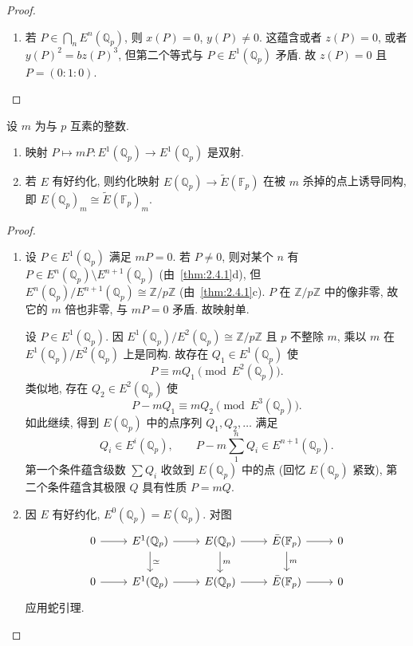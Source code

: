 \begin{proof}
\begin{enumerate}[label=\textup{(\alph*)}]
\item 若 $P\in\bigcap_n E^n(\mathbb{Q}_p)$, 则 $x(P) = 0$, $y(P)\neq 0$. 这蕴含或者 $z(P) = 0$, 或者 $y(P)^2 = bz(P)^3$, 但第二个等式与 $P\in E^1(\mathbb{Q}_p)$ 矛盾. 故 $z(P) = 0$ 且 $P = (0:1:0)$.


\end{enumerate}\end{proof}

\begin{corollary} \label{thm:2.4.2} 
设 $m$ 为与 $p$ 互素的整数.
\begin{enumerate}[label=\textup{(\alph*)}]
\item 映射 $P\mapsto mP\colon E^1(\mathbb{Q}_p)\to E^1(\mathbb{Q}_p)$ 是双射.
\item 若 $E$ 有好约化, 则约化映射 $E(\mathbb{Q}_p)\to\tilde{E}(\mathbb{F}_p)$ 在被 $m$ 杀掉的点上诱导同构, 即 $E(\mathbb{Q}_p)_m\cong\tilde{E}(\mathbb{F}_p)_m$.
\end{enumerate}
\end{corollary}

\begin{proof}\begin{enumerate}[label=\textup{(\alph*)}]

\item 设 $P\in E^1(\mathbb{Q}_p)$ 满足 $mP = 0$. 若 $P\neq 0$, 则对某个 $n$ 有 $P\in E^n(\mathbb{Q}_p)\setminus E^{n+1}(\mathbb{Q}_p)$ (由~\ref{thm:2.4.1}d), 但 $E^n(\mathbb{Q}_p)/E^{n+1}(\mathbb{Q}_p)\cong\mathbb{Z}/p\mathbb{Z}$ (由~\ref{thm:2.4.1}c). $P$ 在 $\mathbb{Z}/p\mathbb{Z}$ 中的像非零, 故它的 $m$ 倍也非零, 与 $mP = 0$ 矛盾. 故映射单.

设 $P\in E^1(\mathbb{Q}_p)$. 因 $E^1(\mathbb{Q}_p)/E^2(\mathbb{Q}_p)\cong\mathbb{Z}/p\mathbb{Z}$ 且 $p$ 不整除 $m$, 乘以 $m$ 在 $E^1(\mathbb{Q}_p)/E^2(\mathbb{Q}_p)$ 上是同构. 故存在 $Q_1\in E^1(\mathbb{Q}_p)$ 使
\[
P\equiv mQ_1 \pmod{E^2(\mathbb{Q}_p)}.
\]
类似地, 存在 $Q_2\in E^2(\mathbb{Q}_p)$ 使
\[
P - mQ_1\equiv mQ_2 \pmod{E^3(\mathbb{Q}_p)}.
\]
如此继续, 得到 $E(\mathbb{Q}_p)$ 中的点序列 $Q_1, Q_2, \dots$ 满足
\[
Q_i\in E^i(\mathbb{Q}_p), \qquad P - m\sum_1^n Q_i\in E^{n+1}(\mathbb{Q}_p).
\]
第一个条件蕴含级数 $\sum Q_i$ 收敛到 $E(\mathbb{Q}_p)$ 中的点 (回忆 $E(\mathbb{Q}_p)$ 紧致), 第二个条件蕴含其极限 $Q$ 具有性质 $P = mQ$.

\item 因 $E$ 有好约化, $E^0(\mathbb{Q}_p) = E(\mathbb{Q}_p)$. 对图
\[\begin{tikzcd}
	0 & {E^1(\Q_p)} & {E(\Q_p)} & {\bar E(\F_p)} & 0 \\
	0 & {E^1(\Q_p)} & {E(\Q_p)} & {\bar E(\F_p)} & 0
	\arrow[from=1-1, to=1-2]
	\arrow[from=1-2, to=1-3]
	\arrow["\simeq", from=1-2, to=2-2]
	\arrow[from=1-3, to=1-4]
	\arrow["m", from=1-3, to=2-3]
	\arrow[from=1-4, to=1-5]
	\arrow["m", from=1-4, to=2-4]
	\arrow[from=2-1, to=2-2]
	\arrow[from=2-2, to=2-3]
	\arrow[from=2-3, to=2-4]
	\arrow[from=2-4, to=2-5]
\end{tikzcd}\]
应用蛇引理.


\end{enumerate}\end{proof}

